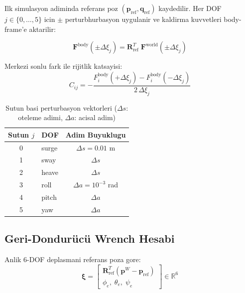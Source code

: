 \documentclass[12pt,a4paper]{article}
\newcommand{\xivec}{\boldsymbol{\xi}}
\begin{document}
Ilk simulasyon adiminda referans poz $(\mathbf{p}_{\text{ref}},
\mathbf{q}_{\text{ref}})$ kaydedilir. Her DOF $j\in\{0,\ldots,5\}$ icin
$\pm$ perturbhurbasyon uygulanir ve kaldirma kuvvetleri body-frame'e aktarilir:

\begin{equation}
  \mathbf{F}^{\text{body}}(\pm\Delta\xi_j)
    = \mathbf{R}_{\text{ref}}^T\;\mathbf{F}^{\text{world}}(\pm\Delta\xi_j)
  \label{eq:stiffness_fd}
\end{equation}

Merkezi sonlu fark ile rijitlik katsayisi:
\begin{equation}
  \boxed{
  C_{ij} = -\frac{F_i^{\text{body}}(+\Delta\xi_j)
             - F_i^{\text{body}}(-\Delta\xi_j)}{2\,\Delta\xi_j}
  }
  \label{eq:c_matrix}
\end{equation}

\begin{table}[H]
  \centering
  \caption{Sutun basi perturbasyon vektorleri ($\Delta s$: oteleme adimi,
           $\Delta a$: acisal adim)}
  \begin{tabular}{clc}
    \toprule
    \textbf{Sutun $j$} & \textbf{DOF} & \textbf{Adim Buyuklugu} \\
    \midrule
    0 & surge  & $\Delta s = 0.01$ m \\
    1 & sway   & $\Delta s$ \\
    2 & heave  & $\Delta s$ \\
    3 & roll   & $\Delta a = 10^{-3}$ rad \\
    4 & pitch  & $\Delta a$ \\
    5 & yaw    & $\Delta a$ \\
    \bottomrule
  \end{tabular}
\end{table}

\subsection{Geri-Dondurücü Wrench Hesabi}

Anlik 6-DOF deplasmani referans poza gore:
\begin{equation}
  \xivec =
  \begin{bmatrix}
    \mathbf{R}_{\text{ref}}^T(\mathbf{p}^W - \mathbf{p}_{\text{ref}}) \\[2pt]
    \phi_e,\;\theta_e,\;\psi_e
  \end{bmatrix} \in \mathbb{R}^6
  \label{eq:xi}
\end{equation}
\end{document}
